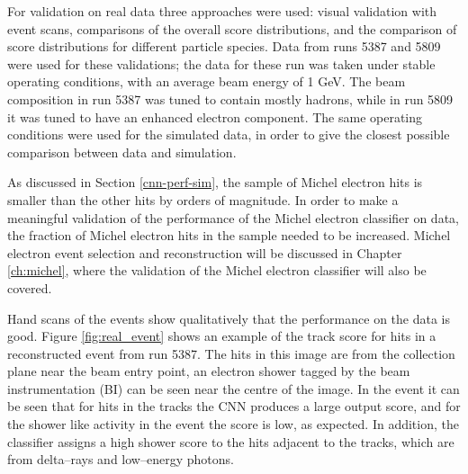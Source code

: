 For validation on real \protodune{} data three approaches were used: visual
validation with event scans, comparisons of the overall score distributions, 
and the comparison of score distributions for different particle species. Data 
from \protodune{} runs 5387 and 5809 were used for these validations; the data 
for these run was taken under stable operating conditions, with an average 
beam energy of 1 GeV. The beam composition in run 5387 was tuned to contain
mostly hadrons, while in run 5809 it was tuned to have an enhanced electron
component. The same operating conditions were used for the simulated data, in
order to give the closest possible comparison between data and simulation.

As discussed in Section \ref{cnn-perf-sim}, the sample of Michel electron hits
is smaller than the other hits by orders of magnitude. In order to make a
meaningful validation of the performance of the Michel electron classifier on
data, the fraction of Michel electron hits in the sample needed to be increased.
Michel electron event selection and reconstruction will be discussed in Chapter
\ref{ch:michel}, where the validation of the Michel electron classifier will
also be covered.

Hand scans of the events show qualitatively that the performance on the data is
good. Figure \ref{fig:real_event} shows an example of the track score for hits
in a reconstructed event from run 5387. The hits in this image are from the
collection plane near the beam entry point, an electron shower tagged by the
beam instrumentation (BI) can be seen near the centre of the image. In the event
it can be seen that for hits in the tracks the CNN produces a large output 
score, and for the shower like activity in the event the score is low, as
expected. In addition, the classifier assigns a high shower score to the hits 
adjacent to the tracks, which are from delta--rays and low--energy photons.

